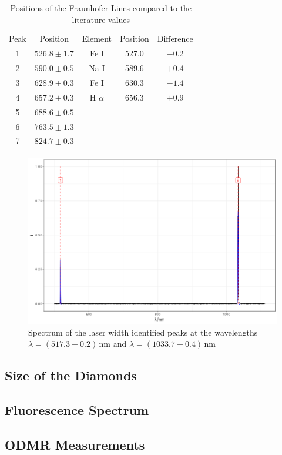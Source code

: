 \begin{table}
	\centering
	\begin{tabular}{c|c|c|c|c}
		Peak&Position&Element&Position \cite{fraunhoferlines}&Difference\\
		1&$526.8\pm1.7$&Fe I&527.0&$-0.2$\\
		2&$590.0\pm0.5$&Na I&589.6&$+0.4$\\
		3&$628.9\pm0.3$&Fe I&630.3&$-1.4$\\
		4&$657.2\pm0.3$&H $\alpha$&656.3&$+0.9$\\
		5&$688.6\pm0.5$&&&\\
		6&$763.5\pm1.3$&&&\\
		7&$824.7\pm0.3$&&&\\
	\end{tabular}
	\caption{Positions of the Fraunhofer Lines compared to the literature values}
\end{table}

\begin{figure}
	\centering
	\includegraphics[width=\textwidth]{../figures/laserspectrum.png}
	\caption{Spectrum of the laser width identified peaks at the wavelengths $\lambda=(517.3\pm0.2)\,\mathrm{nm}$ and $\lambda=(1033.7\pm0.4)\,\mathrm{nm}$}
	\label{fig:laserspectrum}
\end{figure}

\subsection{Size of the Diamonds}

\subsection{Fluorescence Spectrum}

\subsection{ODMR Measurements}